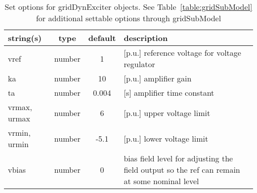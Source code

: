 \begin{table}[ht]
\centering
\begin{tabular}{p{5cm} c c p{7cm}}
\hline
string(s) & type & default & description \\
\hline
vref & number & 1 & [p.u.] reference voltage for voltage regulator\\
ka & number & 10 & [p.u.] amplifier gain\\
ta & number & 0.004 & [s]    amplifier time constant\\
vrmax, urmax & number & 6 & [p.u.] upper voltage limit\\
vrmin, urmin & number & -5.1 & [p.u.] lower voltage limit\\
vbias & number & 0 & bias field level for adjusting the field output so the ref can remain at some nominal level\\
\hline
\end{tabular}
\caption{Set options for gridDynExciter objects. See Table~\ref{table:gridSubModel} for additional settable options through gridSubModel}
\label{table:gridDynExciter}
\end{table}
